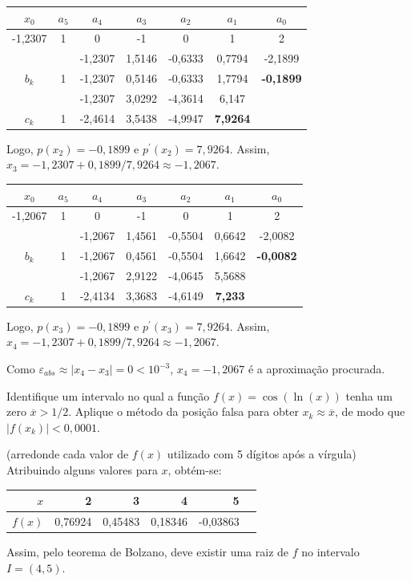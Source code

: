 \documentclass[12pt,a4paper]{article}
\begin{document}
\begin{ExerciseList}
\begin{center}
\begin{tabular}{|c|c|c|c|c|c|c|}
\hline 
$x_0$ & $a_5$ & $a_4$ & $a_3$ & $a_2$ & $a_1$ & $a_0$ \\ 
\hline 
-1,2307 & 1 & 0 & -1 & 0 & 1 & 2 \\ 
\hline 
 &   & -1,2307 & 1,5146 & -0,6333 & 0,7794 & -2,1899 \\ 
\hline 
$b_k$ & 1 & -1,2307 & 0,5146 & -0,6333 & 1,7794 & \textbf{-0,1899} \\ 
\hline 
 &   & -1,2307 & 3,0292 & -4,3614 & 6,147 & \\ 
\hline 
$c_k$ & 1 & -2,4614 & 3,5438 & -4,9947 & \textbf{7,9264} & \\ 
\hline 
\end{tabular}
\end{center}
Logo, $p(x_2) = -0,1899$ e $p^\prime(x_2) = 7,9264$. Assim,
$x_3 = -1,2307 + 0,1899/7,9264 \approx -1,2067$.

\begin{center}
\begin{tabular}{|c|c|c|c|c|c|c|}
\hline 
$x_0$ & $a_5$ & $a_4$ & $a_3$ & $a_2$ & $a_1$ & $a_0$ \\ 
\hline 
-1,2067 & 1 & 0 & -1 & 0 & 1 & 2\\
\hline 
&  & -1,2067 & 1,4561 & -0,5504 & 0,6642 & -2,0082\\
\hline 
$b_k$ & 1 & -1,2067 & 0,4561 & -0,5504 & 1,6642 & \textbf{-0,0082} \\ 
\hline 
&  & -1,2067 & 2,9122 & -4,0645 & 5,5688 & \\
\hline 
$c_k$ & 1 & -2,4134 & 3,3683 & -4,6149 & \textbf{7,233} & \\ 
\hline 
\end{tabular}
\end{center}
Logo, $p(x_3) = -0,1899$ e $p^\prime(x_3) = 7,9264$. Assim,
$x_4 = -1,2307 + 0,1899/7,9264 \approx -1,2067$.

Como $\varepsilon_{abs} \approx |x_4 - x_3| = 0 < 10^{-3}$, $x_4 = -1,2067$ é a aproximação procurada.

\Exercise[title={2,5}] Identifique um intervalo no qual a função $f(x) = \cos(\ln(x))$ tenha um zero $\overline{x} > 1/2$. Aplique o método da posição falsa para obter $x_k \approx \overline{x}$, de modo que $|f(x_k)| < 0,0001$.

(arredonde cada valor de $f(x)$ utilizado com 5 dígitos após a vírgula)
\Answer Atribuindo alguns valores para $x$, obtém-se:
\begin{center}
\begin{tabular}{|r|r|r|r|r|r|}
\hline
$x$    & 2   & 3   & 4    &  5 \\
\hline
$f(x)$ & 0,76924 & 0,45483 & 0,18346 & -0,03863 \\
\hline
\end{tabular}
\end{center}
Assim, pelo teorema de Bolzano, deve existir uma raiz de $f$ no intervalo $I = (4, 5)$.


\end{ExerciseList}
\end{document}
